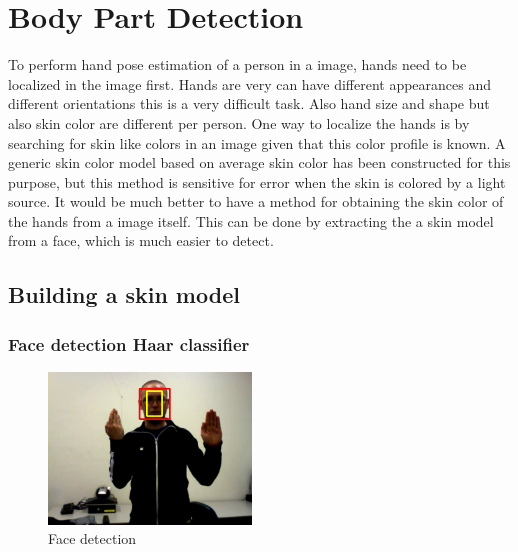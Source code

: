 
\chapter{Body Part Detection}
\label{ch:bodyparts}

To perform hand pose estimation of a person in a image, hands need to be localized in the image first. Hands are very can have different appearances and different orientations this is a very difficult task. Also hand size and shape but also skin color are different per person. One way to localize the hands is by searching for skin like colors in an image given that this color profile is known. A generic skin color model based on average skin color has been constructed for this purpose\cite{Jones1999}, but this method is sensitive for error when the skin is colored by a light source. It would be much better to have a method for obtaining the skin color of the hands from a image itself. This can be done by extracting the a skin model from a face, which is much easier to detect.

\section{Building a skin model}
\label{sec:skinmodel}

\subsection*{Face detection \- Haar classifier}

\begin{figure}
  \vspace{-20pt}
  \begin{center}
    \includegraphics[width=0.48\textwidth]{figures/pipeline/detected.jpg}
 \end{center}
  \vspace{-20pt}
  \caption{Face detection}
  \label{fig:face_detection}
  \vspace{-10pt}
\end{figure}


